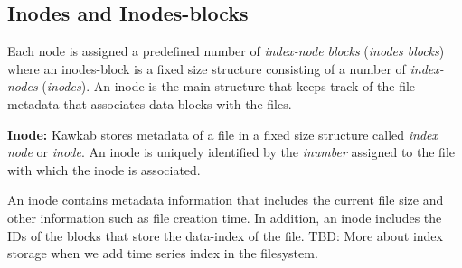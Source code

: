 \documentclass[]{article}
\newcommand{\subtopic}[1]{\vspace{1.5pt} \noindent \textbf{#1}}
\newcommand{\hl}[1]{\textcolor{hlcolor}{#1}}
\begin{document}
\subsection{Inodes and Inodes-blocks} 

Each node is assigned a predefined number of \textit{index-node blocks}
(\textit{inodes blocks}) where an inodes-block is a fixed size structure
consisting of a number of \textit{index-nodes} (\textit{inodes}).  An inode
is the main structure that keeps track of the file metadata that associates
data blocks with the files.


\subtopic{Inode:} Kawkab stores metadata of a file in a fixed size structure
called \textit{index node} or \textit{inode}. An inode is uniquely identified by
the \textit{inumber} assigned to the file with which the inode is associated.

An inode contains metadata information that includes the current file size 
and other information such as file creation time. In addition, an inode includes
the IDs of the blocks that store the data-index of the file.
\hl{TBD: More about index storage when we add time series index in the
filesystem.}


%
%
%
%
%
\end{document}
